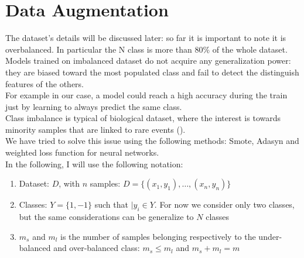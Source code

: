 \documentclass[LaM,binding=0.6cm]{sapthesis}
\begin{document}
\section{Data Augmentation}
The dataset's details will be discussed later: so far it is important to note it is overbalanced. In particular the N class is more than 80\% of the whole dataset.\\Models trained on imbalanced dataset do not acquire any generalization power: they are biased toward the most populated class and fail to detect the distinguish features of the others.\\For example in our case, a model could reach a high accuracy during the train just by learning to always predict the same class.\\Class imbalance is typical of biological dataset, where the interest is towards minority samples that are linked to rare events (\cite{conf/ijcnn/HeBGL08}).\\We have tried to solve this issue using the following methods: Smote, Adasyn and weighted loss function for neural networks.\\In the following, I will use the following notation:
\begin{enumerate}
\item Dataset: $D$, with $n$ samples: $D=\{(x_1,y_1),\dots,(x_n,y_n)\}$
\item Classes: $Y=\{1,-1\}$ such that $|y_i \in Y$. For now we consider only two classes, but the same considerations can be generalize to $N$ classes 
\item $m_s$ and $m_l$ is the number of samples belonging respectively to the under-balanced and over-balanced class: $m_s\leq m_l$ and $m_s+m_l=m$
\end{enumerate}
\end{document}
